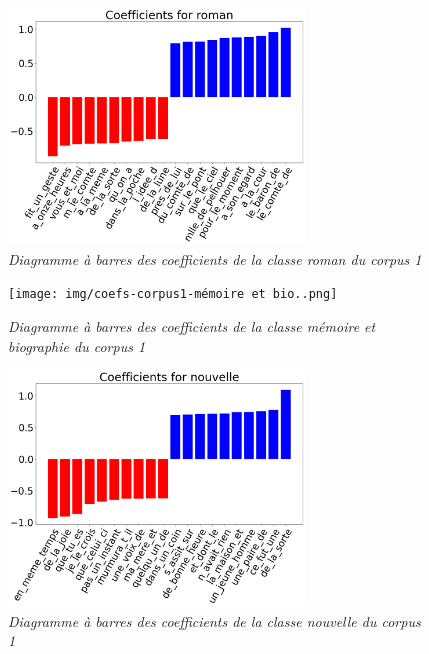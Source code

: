\begin{figure}[H]
\centering %
\includegraphics[width=0.70\textwidth]{img/coefs-corpus1-roman.png}
\caption{\textit{Diagramme à barres des coefficients de la classe roman du corpus 1}}
\label{'fig:coefs-corpus1-roman'}
\end{figure}

\begin{figure}[H]
\centering %
\texttt{[image: img/coefs-corpus1-mémoire et bio..png]}
\caption{\textit{Diagramme à barres des coefficients de la classe mémoire et biographie du corpus 1}}
\label{'fig:coefs-corpus1-mémoire et bio.'}
\end{figure}

\begin{figure}[H]
\centering %
\includegraphics[width=0.70\textwidth]{img/coefs-corpus1-nouvelle.png}
\caption{\textit{Diagramme à barres des coefficients de la classe nouvelle du corpus 1}}
\label{'fig:coefs-corpus1-nouvelle'}
\end{figure}


